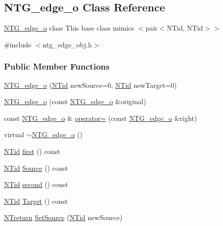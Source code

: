 \subsection{NTG\_\-edge\_\-o Class Reference}
\label{class_n_t_g__edge__o}


\hyperlink{class_n_t_g__edge__o}{NTG\_\-edge\_\-o} class This base class mimics $<$pair$<$NTid, NTid$>$$>$  




{\ttfamily \#include $<$ntg\_\-edge\_\-obj.h$>$}

\subsubsection*{Public Member Functions}
\begin{DoxyCompactItemize}
\item 
\hyperlink{class_n_t_g__edge__o_a37a7273eba1e079ff0b8d7999ffd686e}{NTG\_\-edge\_\-o} (\hyperlink{nt__types_8h_ab5cab5f78fdd2211c340cbe527a4afd7}{NTid} newSource=0, \hyperlink{nt__types_8h_ab5cab5f78fdd2211c340cbe527a4afd7}{NTid} newTarget=0)
\item 
\hyperlink{class_n_t_g__edge__o_a8518deb20da3083e80de4537c8a2a3a2}{NTG\_\-edge\_\-o} (const \hyperlink{class_n_t_g__edge__o}{NTG\_\-edge\_\-o} \&original)
\item 
const \hyperlink{class_n_t_g__edge__o}{NTG\_\-edge\_\-o} \& \hyperlink{class_n_t_g__edge__o_aab58230a12b3f2f2a5d35116a3f18205}{operator=} (const \hyperlink{class_n_t_g__edge__o}{NTG\_\-edge\_\-o} \&right)
\item 
virtual \hyperlink{class_n_t_g__edge__o_a5ee3b2aecb9b7c4c96ffd48f37d0f593}{$\sim$NTG\_\-edge\_\-o} ()
\item 
\hyperlink{nt__types_8h_ab5cab5f78fdd2211c340cbe527a4afd7}{NTid} \hyperlink{class_n_t_g__edge__o_a8d7c2f204a95e55dd1dd499782bd2237}{first} () const 
\item 
\hyperlink{nt__types_8h_ab5cab5f78fdd2211c340cbe527a4afd7}{NTid} \hyperlink{class_n_t_g__edge__o_abcdc0ecb1dc66f3b1eeeecaee9658bba}{Source} () const 
\item 
\hyperlink{nt__types_8h_ab5cab5f78fdd2211c340cbe527a4afd7}{NTid} \hyperlink{class_n_t_g__edge__o_a5729d53932e86909441bfc3e80d82f75}{second} () const 
\item 
\hyperlink{nt__types_8h_ab5cab5f78fdd2211c340cbe527a4afd7}{NTid} \hyperlink{class_n_t_g__edge__o_a7810161cda805c84e9eead140e568335}{Target} () const 
\item 
\hyperlink{nt__types_8h_ab9564ee8f091e809d21b8451c6683c53}{NTreturn} \hyperlink{class_n_t_g__edge__o_a3cf36655236151f97c0ecf3c07ba8bfd}{SetSource} (\hyperlink{nt__types_8h_ab5cab5f78fdd2211c340cbe527a4afd7}{NTid} newSource)

\end{DoxyCompactItemize}
